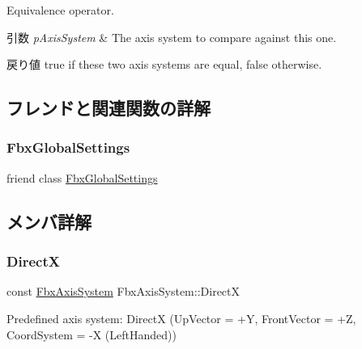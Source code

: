 Equivalence operator. 
\begin{DoxyParams}{引数}
{\em p\+Axis\+System} & The axis system to compare against this one. \\
\hline
\end{DoxyParams}
\begin{DoxyReturn}{戻り値}
{\ttfamily true} if these two axis systems are equal, {\ttfamily false} otherwise. 
\end{DoxyReturn}


\subsection{フレンドと関連関数の詳解}
\mbox{\label{class_fbx_axis_system_ac6f6b3953bf13718eb87110d614b3c9a}} 
\subsubsection{\texorpdfstring{Fbx\+Global\+Settings}{FbxGlobalSettings}}
{\footnotesize\ttfamily friend class \hyperlink{class_fbx_global_settings}{Fbx\+Global\+Settings}\hspace{0.3cm}{\ttfamily [friend]}}



\subsection{メンバ詳解}
\mbox{\label{class_fbx_axis_system_a2eddfe5afe7db5f56adee774c51559e9}} 
\subsubsection{\texorpdfstring{DirectX}{DirectX}}
{\footnotesize\ttfamily const \hyperlink{class_fbx_axis_system}{Fbx\+Axis\+System} Fbx\+Axis\+System\+::\+DirectX\hspace{0.3cm}{\ttfamily [static]}}



Predefined axis system\+: DirectX (Up\+Vector = +Y, Front\+Vector = +Z, Coord\+System = -\/X (Left\+Handed)) 

